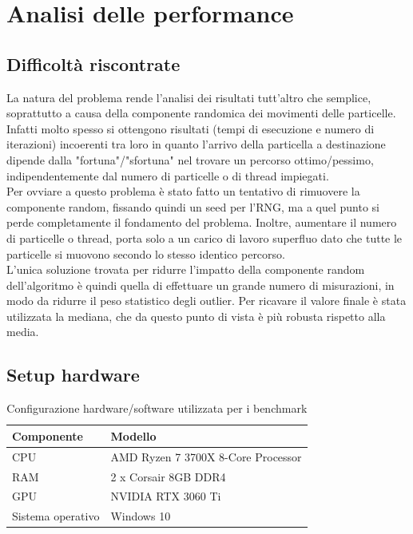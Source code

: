 \documentclass{article}
\begin{document}
\newpage
\section{Analisi delle performance}
\label{sec:performance}

\subsection{Difficoltà riscontrate}
\label{subsec:difficulties}
La natura del problema rende l'analisi dei risultati tutt'altro che semplice, soprattutto a causa della componente randomica dei movimenti delle particelle. Infatti molto spesso si ottengono risultati (tempi di esecuzione e numero di iterazioni) incoerenti tra loro in quanto l'arrivo della particella a destinazione dipende dalla "fortuna"/"sfortuna" nel trovare un percorso ottimo/pessimo, indipendentemente dal numero di particelle o di thread impiegati.\\
Per ovviare a questo problema è stato fatto un tentativo di rimuovere la componente random, fissando quindi un seed per l'RNG, ma a quel punto si perde completamente il fondamento del problema. Inoltre, aumentare il numero di particelle o thread, porta solo a un carico di lavoro superfluo dato che tutte le particelle si muovono secondo lo stesso identico percorso.\\
L'unica soluzione trovata per ridurre l'impatto della componente random dell'algoritmo è quindi quella di effettuare un grande numero di misurazioni, in modo da ridurre il peso statistico degli outlier. Per ricavare il valore finale è stata utilizzata la mediana, che da questo punto di vista è più robusta rispetto alla media.

\subsection{Setup hardware}
\renewcommand{\arraystretch}{1.4}
\begin{table}[H]
    \centering
    \begin{tabularx}{\textwidth}{ | l  X | }
        \hline
        \rowcolor{lightgray!70}
        \textbf{Componente} & \textbf{Modello} \\
        \hline
        CPU & AMD Ryzen 7 3700X 8-Core Processor\\
        \rowcolor{lightgray!40}
        RAM & 2 x Corsair 8GB DDR4\\
        GPU & NVIDIA RTX 3060 Ti\\
        \rowcolor{lightgray!40}
        Sistema operativo & Windows 10\\
        \hline
    \end{tabularx}
    \caption{Configurazione hardware/software utilizzata per i benchmark}
    \label{tab:hw_setup}
\end{table}
\end{document}
